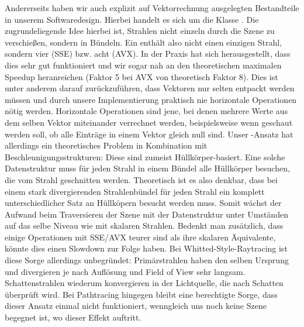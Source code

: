 Andererseits haben wir auch explizit auf Vektorrechnung ausgelegten Bestandteile in unserem Softwaredesign.
Hierbei handelt es sich um die Klasse .
Die zugrundeliegende Idee hierbei ist, Strahlen nicht einzeln durch die Szene zu verschießen, sondern in Bündeln.
Ein  enthält also nicht einen einzigen Strahl, sondern vier (SSE) bzw. acht (AVX).
In der Praxis hat sich herausgestellt, dass dies sehr gut funktioniert und wir sogar nah an den theoretischen maximalen Speedup heranreichen (Faktor 5 bei AVX von theoretisch Faktor 8).
Dies ist unter anderem darauf zurückzuführen, dass Vektoren nur selten entpackt werden müssen und durch unsere Implementierung praktisch nie horizontale Operationen nötig werden.
Horizontale Operationen sind jene, bei denen mehrere Werte aus dem selben Vektor miteinander verrechnet werden, beispielsweise wenn geschaut werden soll, ob alle Einträge in einem Vektor gleich null sind.
Unser -Ansatz hat allerdings ein theoretisches Problem in Kombination mit Beschleunigungsstrukturen:
Diese sind zumeist Hüllkörper-basiert.
Eine solche Datenstruktur muss für jeden Strahl in einem Bündel alle Hüllkörper besuchen, die vom Strahl geschnitten werden.
Theoretisch ist es also denkbar, dass bei einem stark divergierenden Strahlenbündel für jeden Strahl ein komplett unterschiedlicher Satz an Hüllköpern besucht werden muss.
Somit wächst der Aufwand beim Traversieren der Szene mit der Datenstruktur unter Umständen auf das selbe Niveau wie mit skalaren Strahlen.
Bedenkt man zusätzlich, dass einige Operationen mit SSE/AVX teurer sind als ihre skalaren Äquivalente, könnte dies einen Slowdown zur Folge haben.
Bei Whitted-Style-Raytracing ist diese Sorge allerdings unbegründet:
Primärstrahlen haben den selben Ursprung und divergieren je nach Auflösung und Field of View sehr langsam.
Schattenstrahlen wiederum konvergieren in der Lichtquelle, die nach Schatten überprüft wird.
Bei Pathtracing hingegen bleibt eine berechtigte Sorge, dass dieser Ansatz einmal nicht funktioniert, wenngleich uns noch keine Szene begegnet ist, wo dieser Effekt auftritt. 
